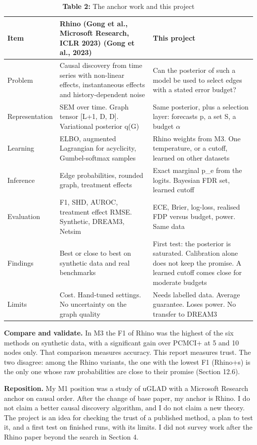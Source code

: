 \documentclass[10pt]{article}
\begin{document}
\begin{table}[!ht]\centering
\captionsetup{type=table}\caption*{\textbf{Table 2:} The anchor work and this project}
\footnotesize
\begin{tabular}{>{\raggedright\arraybackslash}p{0.80in}>{\raggedright\arraybackslash}p{2.17in}>{\raggedright\arraybackslash}p{2.25in}}\toprule
\textbf{Item} & \textbf{Rhino (Gong et al., Microsoft Research, ICLR 2023) (Gong et al., 2023)} & \textbf{This project} \\ \midrule
Problem & Causal discovery from time series with non-linear effects, instantaneous effects and history-dependent noise & Can the posterior of such a model be used to select edges with a stated error budget? \\
Representation & SEM over time. Graph tensor [L+1, D, D]. Variational posterior q(G) & Same posterior, plus a selection layer: forecasts p, a set S, a budget $\alpha$ \\
Learning & ELBO, augmented Lagrangian for acyclicity, Gumbel-softmax samples & Rhino weights from M3. One temperature, or a cutoff, learned on other datasets \\
Inference & Edge probabilities, rounded graph, treatment effects & Exact marginal p\_e from the logits. Bayesian FDR set, learned cutoff \\
Evaluation & F1, SHD, AUROC, treatment effect RMSE. Synthetic, DREAM3, Netsim & ECE, Brier, log-loss, realised FDP versus budget, power. Same data \\
Findings & Best or close to best on synthetic data and real benchmarks & First test: the posterior is saturated. Calibration alone does not keep the promise. A learned cutoff comes close for moderate budgets \\
Limits & Cost. Hand-tuned settings. No uncertainty on the graph quality & Needs labelled data. Average guarantee. Loses power. No transfer to DREAM3 \\
\bottomrule\end{tabular}
\end{table}
\textbf{Compare and validate.} In M3 the F1 of Rhino was the highest of the six methods on synthetic data, with a significant gain over PCMCI+ at 5 and 10 nodes only. That comparison measures accuracy. This report measures trust. The two disagree: among the Rhino variants, the one with the lowest F1 (Rhino+s) is the only one whose raw probabilities are close to their promise (Section 12.6).

\textbf{Reposition.} My M1 position was a study of uGLAD with a Microsoft Research anchor on causal order. After the change of base paper, my anchor is Rhino. I do not claim a better causal discovery algorithm, and I do not claim a new theory. The project is an idea for checking the trust of a published method, a plan to test it, and a first test on finished runs, with its limits. I did not survey work after the Rhino paper beyond the search in Section 4.
\end{document}
